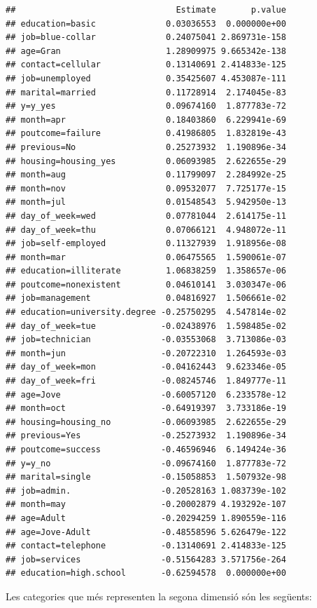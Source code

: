 \documentclass[
]{article}
\begin{document}
\begin{verbatim}
##                                Estimate       p.value
## education=basic              0.03036553  0.000000e+00
## job=blue-collar              0.24075041 2.869731e-158
## age=Gran                     1.28909975 9.665342e-138
## contact=cellular             0.13140691 2.414833e-125
## job=unemployed               0.35425607 4.453087e-111
## marital=married              0.11728914  2.174045e-83
## y=y_yes                      0.09674160  1.877783e-72
## month=apr                    0.18403860  6.229941e-69
## poutcome=failure             0.41986805  1.832819e-43
## previous=No                  0.25273932  1.190896e-34
## housing=housing_yes          0.06093985  2.622655e-29
## month=aug                    0.11799097  2.284992e-25
## month=nov                    0.09532077  7.725177e-15
## month=jul                    0.01548543  5.942950e-13
## day_of_week=wed              0.07781044  2.614175e-11
## day_of_week=thu              0.07066121  4.948072e-11
## job=self-employed            0.11327939  1.918956e-08
## month=mar                    0.06475565  1.590061e-07
## education=illiterate         1.06838259  1.358657e-06
## poutcome=nonexistent         0.04610141  3.030347e-06
## job=management               0.04816927  1.506661e-02
## education=university.degree -0.25750295  4.547814e-02
## day_of_week=tue             -0.02438976  1.598485e-02
## job=technician              -0.03553068  3.713086e-03
## month=jun                   -0.20722310  1.264593e-03
## day_of_week=mon             -0.04162443  9.623346e-05
## day_of_week=fri             -0.08245746  1.849777e-11
## age=Jove                    -0.60057120  6.233578e-12
## month=oct                   -0.64919397  3.733186e-19
## housing=housing_no          -0.06093985  2.622655e-29
## previous=Yes                -0.25273932  1.190896e-34
## poutcome=success            -0.46596946  6.149424e-36
## y=y_no                      -0.09674160  1.877783e-72
## marital=single              -0.15058853  1.507932e-98
## job=admin.                  -0.20528163 1.083739e-102
## month=may                   -0.20002879 4.193292e-107
## age=Adult                   -0.20294259 1.890559e-116
## age=Jove-Adult              -0.48558596 5.626479e-122
## contact=telephone           -0.13140691 2.414833e-125
## job=services                -0.51564283 3.571756e-264
## education=high.school       -0.62594578  0.000000e+00
\end{verbatim}

Les categories que més representen la segona dimensió són les següents:
\end{document}
